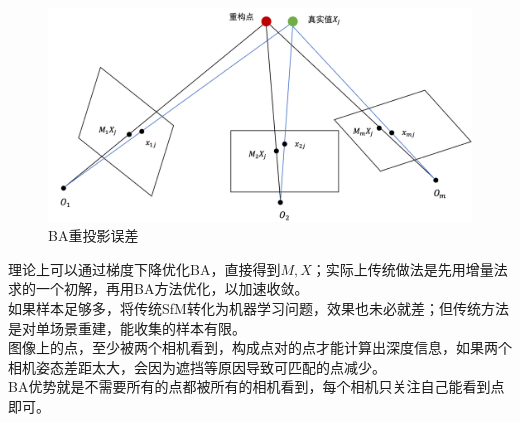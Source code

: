 	\begin{figure}[H]
		\begin{center}
			\includegraphics[width=\textwidth]{images/ba.png}
		\end{center}
		\caption{BA重投影误差}
	\end{figure}

	理论上可以通过梯度下降优化BA，直接得到$M,X$；实际上传统做法是先用增量法求的一个初解，再用BA方法优化，以加速收敛。\\

	如果样本足够多，将传统SfM转化为机器学习问题，效果也未必就差；但传统方法是对单场景重建，能收集的样本有限。\\

	图像上的点，至少被两个相机看到，构成点对的点才能计算出深度信息，如果两个相机姿态差距太大，会因为遮挡等原因导致可匹配的点减少。\\

	BA优势就是不需要所有的点都被所有的相机看到，每个相机只关注自己能看到点即可。